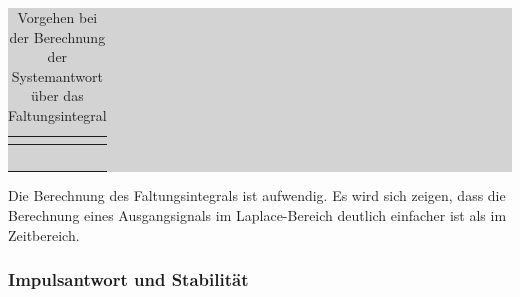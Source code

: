 \begin{table}[H]
\caption{Vorgehen bei der Berechnung der Systemantwort über das Faltungsintegral}
\setlength{\fboxsep}{0pt}%
\colorbox{lightgray}{%
%
\begin{tabular}{| c | c |}
\hline
\parbox[c][0.28in][c]{0.45in}{\smallskip\centering\textbf{\selectfont{Schritt}}} & \parbox[c][0.28in][c]{6in}{\smallskip\centering\textbf{\selectfont{Beschreibung}}}\\ \hline

\parbox[c][0.4in][c]{0.45in}{} &
\parbox[c][0.4in][c]{6in}{}\\ \hline

\parbox[c][0.4in][c]{0.45in}{} & \parbox[c][0.4in][c]{6in}{}\\ \hline

\parbox[c][0.6in][c]{0.45in}{} &
\parbox[c][0.6in][c]{6in}{}\\ \hline

\parbox[c][0.4in][c]{0.45in}{} &
\parbox[c][0.4in][c]{6in}{}\\ \hline

\parbox[c][0.4in][c]{0.45in}{} &
\parbox[c][0.4in][c]{6in}{}\\ \hline

\end{tabular}%
}\bigskip
\label{tab:threenine}
\end{table}

\noindent Die Berechnung des Faltungsintegrals ist aufwendig. Es wird sich zeigen, dass die Berechnung eines Ausgangsignals im Laplace-Bereich deutlich einfacher ist als im Zeitbereich.

\subsubsection{Impulsantwort und Stabilität}\label{threefourfive}

